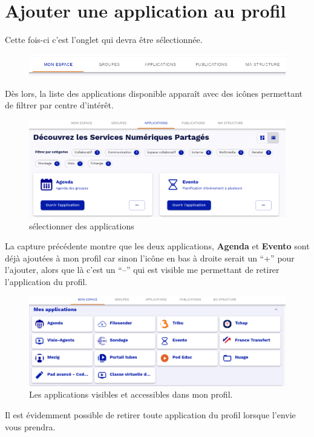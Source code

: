 \section{Ajouter une application au profil}
Cette fois-ci c'est l'onglet  qui devra être sélectionnée.
\begin{figure}
	\centering
	\includegraphics[width=\linewidth]{./Captures/portail.barre.seule.png}
\end{figure}
Dès lors, la liste des applications disponible apparaît avec des icônes permettant de filtrer par centre d'intérêt.
\begin{figure}
	\centering
	\includegraphics{./Captures/portail.applications.selection.png}
	\caption{sélectionner des applications}
\end{figure}
La capture précédente montre que les deux applications, \textbf{Agenda} et \textbf{Evento} sont déjà ajoutées à mon profil car sinon l'icône en bas à droite serait un ``+'' pour l'ajouter, alors que là c'est un ``--'' qui est visible me permettant de retirer l'application du profil.
\begin{figure}
 	\centering
 	\includegraphics{./Captures/portail.mes.applications.png}
 	\caption{Les applications visibles et accessibles dans mon profil.}
 \end{figure}
Il est évidemment possible de retirer toute application du profil lorsque l'envie vous prendra.